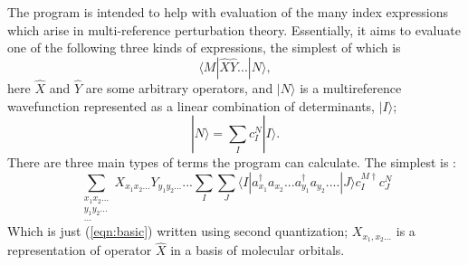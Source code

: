 The program is intended to help with evaluation of the many index expressions
which arise in multi-reference perturbation theory.  Essentially, it aims to
evaluate one of the following three kinds of expressions, the simplest of which
is
\begin{equation}
\langle M | \hat{X} \hat{Y} ... | N \rangle,
\label{eqn:basic}
\end{equation}
\noindent here $\hat{X}$ and $\hat{Y}$ are some arbitrary operators, and $| N
\rangle$  is a multireference wavefunction represented as a linear combination
of determinants, $|I\rangle $;
\begin{equation}
|N\rangle = \sum_{I} c_{I}^{N}| I \rangle.
\end{equation} 
\noindent There are three main types of terms the program can calculate. The simplest is :
\begin{equation}
\sum_{\substack{ x_{1}x_{2}...\\ y_{1}y_{2}... \\ ...}} X_{x_{1}x_{2}...} Y_{y_{1}y_{2}...} ...
\sum_{I}\sum_{J}
\langle I | a^{\dagger}_{x_{1}} a_{x_{2}}...a^{\dagger}_{y_{1}}a_{y_{2}}....| J \rangle 
 c^{M \dagger}_{I}c^{N}_{J}
\label{eqn:basic_2nd_quantized}
\end{equation}
\noindent  Which is just (\ref{eqn:basic}) written using second quantization;
$X_{x_{1},x_{2}...}$ is a representation of operator $\hat{X}$ in a basis of
molecular orbitals. \\


